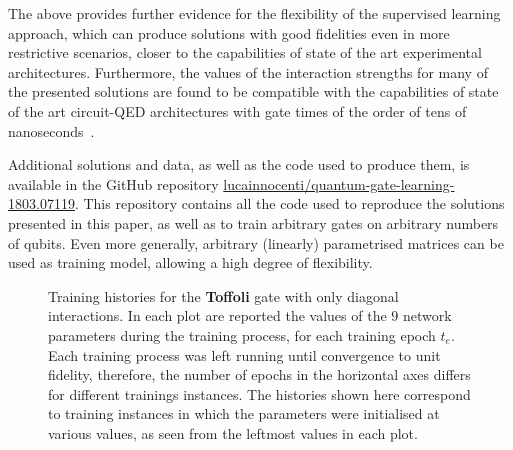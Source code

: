 The above provides further evidence for the flexibility of the supervised learning approach, which can produce solutions with good fidelities even in more restrictive scenarios, closer to the capabilities of state of the art experimental architectures.
Furthermore, the values of the interaction strengths for many of the presented solutions are found to be compatible with the capabilities of state of the art circuit-QED architectures with gate times of the order of tens of nanoseconds~\cite{potocnik2018studying}.

Additional solutions and data, as well as the code used to produce them, is available in the GitHub repository
\href{https://github.com/lucainnocenti/quantum-gate-learning-1803.07119}{lucainnocenti/quantum-gate-learning-1803.07119}.
This repository contains all the code used to reproduce the solutions presented in this paper, as well as to train arbitrary gates on arbitrary numbers of qubits.
Even more generally, arbitrary (linearly) parametrised matrices can be used as training model, allowing a high degree of flexibility.

\begin{figure}[htbp]
	\centering
	\caption{
		Training histories for the \textbf{Toffoli} gate with only diagonal interactions.
		In each plot are reported the values of the $9$ network parameters during the training process, for each training epoch $t_e$.
		Each training process was left running until convergence to unit fidelity, therefore, the number of epochs in the horizontal axes differs for different trainings instances.
		The histories shown here correspond to training instances in which the parameters were initialised at various values, as seen from the leftmost values in each plot.
	}
	\label{fig:toffoli_diagonal_parhistories}
\end{figure}
 
